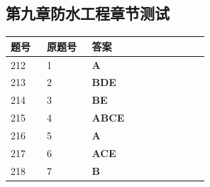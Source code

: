\documentclass[UTF8,fontset=windows,11pt]{ctexart}
\begin{document}
\subsection*{第九章防水工程章节测试}
\begin{longtable}{p{0.16\linewidth}p{0.2\linewidth}p{0.52\linewidth}}
\textbf{\textcolor{examnavy}{题号}} & \textbf{\textcolor{examnavy}{原题号}} & \textbf{\textcolor{answergreen}{答案}} \\
\hline
212 & 1 & \textbf{\textcolor{answergreen}{A}} \\
213 & 2 & \textbf{\textcolor{answergreen}{BDE}} \\
214 & 3 & \textbf{\textcolor{answergreen}{BE}} \\
215 & 4 & \textbf{\textcolor{answergreen}{ABCE}} \\
216 & 5 & \textbf{\textcolor{answergreen}{A}} \\
217 & 6 & \textbf{\textcolor{answergreen}{ACE}} \\
218 & 7 & \textbf{\textcolor{answergreen}{B}} \\
\end{longtable}
\vspace{0.4em}
\end{document}
